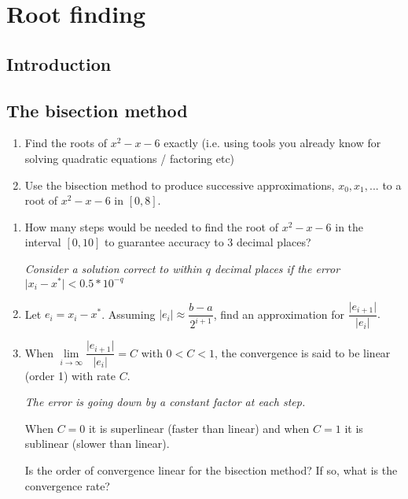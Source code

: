 \documentclass[12pt,letterpaper,noanswers]{exam}
\begin{document}
\section*{Root finding}
\subsection*{Introduction}


\subsection*{The bisection method}

\begin{enumerate}
\itemsep50pt
\item Find the roots of $x^2-x-6$ exactly (i.e. using tools you already know for solving quadratic equations / factoring etc)
\item Use the bisection method to produce successive approximations, $x_0, x_1, ...$ to a root of $x^2-x-6$ in $[0,8]$.

\end{enumerate}
\vspace{1in}

\begin{enumerate}[resume]
    \item How many steps would be needed to find the root of $x^2-x-6$ in the interval $[0,10]$ to guarantee accuracy to $3$ decimal places?  
    


\emph{Consider a solution correct to within $q$ decimal places if the error $\vert x_i - x^*\vert < 0.5*10^{-q}$}
\vspace{1in}


    \item Let $e_i = x_i - x^*$.  Assuming $\vert e_i \vert \approx\dfrac{b-a}{2^{i+1}}$, find an approximation for $\dfrac{ \vert e_{i+1} \vert}{ \vert e_i \vert}.$
        \vspace{1in}
        
    \item When $\lim\limits_{i\rightarrow\infty} \dfrac{ \vert e_{i+1} \vert}{ \vert e_i \vert} = C$ with $0<C<1$, the convergence is said to be linear (order 1) with rate $C$.  
    
    \emph{The error is going down by a constant factor at each step.}
    
    When $C = 0$ it is superlinear (faster than linear) and when $C = 1$ it is sublinear (slower than linear).  

Is the order of convergence linear for the bisection method?  If so, what is the convergence rate?


\vspace{0.5in}

\end{enumerate}
\end{document}
